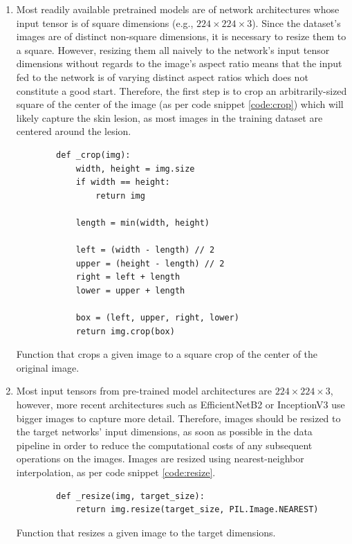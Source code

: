     \begin{enumerate}
        \item Most readily available pretrained models are of network architectures whose input tensor is of square dimensions (e.g., $224 \times 224 \times 3$). Since the dataset's images are of distinct non-square dimensions, it is necessary to resize them to a square. However, resizing them all naively to the network's input tensor dimensions without regards to the image's aspect ratio means that the input fed to the network is of varying distinct aspect ratios which does not constitute a good start. Therefore, the first step is to crop an arbitrarily-sized square of the center of the image (as per code snippet \ref{code:crop}) which will likely capture the skin lesion, as most images in the training dataset are centered around the lesion. \par
    
        \begin{listing}[ht]
        \begin{verbatim}
        def _crop(img):
            width, height = img.size
            if width == height:
                return img
    
            length = min(width, height)
    
            left = (width - length) // 2
            upper = (height - length) // 2
            right = left + length
            lower = upper + length
    
            box = (left, upper, right, lower)
            return img.crop(box)
        \end{verbatim}
        \caption{Function that crops a given image to a square crop of the center of the original image.}
        \label{code:crop}
        \end{listing}
    
    \item Most input tensors from pre-trained model architectures are $224 \times 224 \times 3$, however, more recent architectures such as EfficientNetB2 or InceptionV3 use bigger images to capture more detail. Therefore, images should be resized to the target networks' input dimensions, as soon as possible in the data pipeline in order to reduce the computational costs of any subsequent operations on the images. Images are resized using nearest-neighbor interpolation, as per code snippet \ref{code:resize}.
    
        \begin{listing}[ht]
        \begin{verbatim}
        def _resize(img, target_size):
            return img.resize(target_size, PIL.Image.NEAREST)
        \end{verbatim}
        \caption{Function that resizes a given image to the target dimensions.}
        \label{code:resize}
        \end{listing}
    

\end{enumerate}
